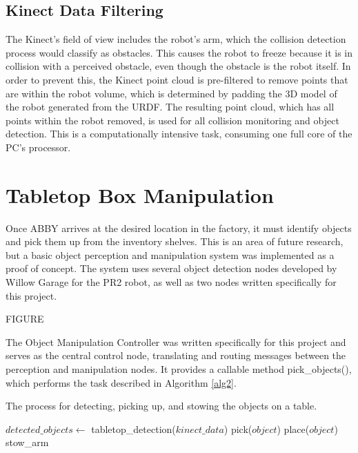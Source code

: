 \documentclass[]{cwru} %
\begin{document}
\subsection{Kinect Data Filtering}

The Kinect's field of view includes the robot's arm, which the collision
detection process would classify as obstacles. This causes the robot to
freeze because it is in collision with a perceived obstacle, even though
the obstacle is the robot itself. In order to prevent this, the Kinect
point cloud is pre-filtered to remove points that are within the robot
volume, which is determined by padding the 3D model of the robot
generated from the URDF. The resulting point cloud, which has all points
within the robot removed, is used for all collision monitoring and
object detection. This is a computationally intensive task, consuming
one full core of the PC's processor.

\section{Tabletop Box Manipulation}

Once ABBY arrives at the desired location in the factory, it must
identify objects and pick them up from the inventory shelves. This is an
area of future research, but a basic object perception and manipulation
system was implemented as a proof of concept. The system uses several
object detection nodes developed by Willow Garage for the PR2 robot, as
well as two nodes written specifically for this project.

FIGURE

The Object Manipulation Controller was written specifically for this
project and serves as the central control node, translating and routing
messages between the perception and manipulation nodes. It provides a
callable method pick\_objects(), which performs the task described in
Algorithm \ref{alg2}.

\begin{algorithm}
\label{alg2}
\caption{The process for detecting, picking up, and stowing the objects
on a table.}
\begin{algorithmic}

\STATE $detected\_objects \gets$ tabletop\_detection($kinect\_data$)
    \STATE pick($object$)
    \STATE place($object$)
    \STATE stow\_arm
  \ENDIF
\ENDFOR
\end{algorithmic}
\end{algorithm}
\end{document}
